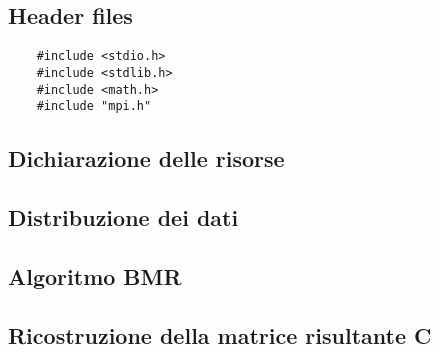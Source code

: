 \subsection{Header files}
\begin{lstlisting}
    #include <stdio.h>
    #include <stdlib.h>
    #include <math.h>
    #include "mpi.h"
\end{lstlisting}

\subsection{Dichiarazione delle risorse}

\subsection{Distribuzione dei dati}

\subsection{Algoritmo BMR}

\subsection{Ricostruzione della matrice risultante C}